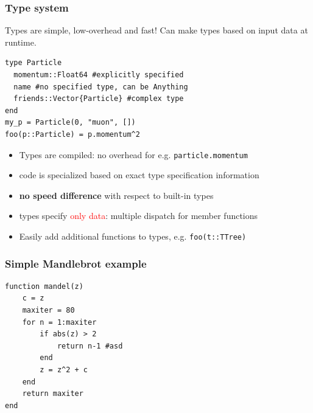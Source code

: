 \documentclass[16pt]{beamer}
\begin{document}
\begin{frame}[fragile]
\frametitle{Type system}

Types are simple, low-overhead and fast! Can make types based on input data at runtime.
\begin{lstlisting}
type Particle
  momentum::Float64 #explicitly specified
  name #no specified type, can be Anything
  friends::Vector{Particle} #complex type
end
my_p = Particle(0, "muon", [])
foo(p::Particle) = p.momentum^2
\end{lstlisting}

\begin{itemize}
\item Types are compiled: no overhead for e.g. \texttt{particle.momentum}
\item code is  specialized based on exact type specification information
\item \textbf{no speed difference} with respect to built-in types
\item types specify \textcolor{red}{only data}: multiple dispatch for member functions
\item Easily add additional functions to types, e.g. \texttt{foo(t::TTree)}
\end{itemize}

\end{frame}




\begin{frame}[fragile]
\frametitle{Simple Mandlebrot example}

\begin{lstlisting}
function mandel(z)
    c = z
    maxiter = 80
    for n = 1:maxiter
        if abs(z) > 2
            return n-1 #asd
        end
        z = z^2 + c
    end
    return maxiter
end
\end{lstlisting}
\end{frame}
\end{document}
